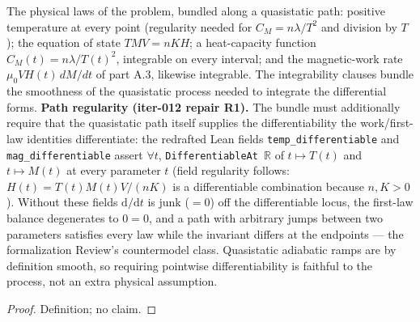 \begin{definition}
\label{def:IPhO2026Problems_problem_IPhO_2026_3_B_2:ParamagneticTorusLaws}
The physical laws of the problem, bundled along a quasistatic path: positive
temperature at every point (regularity needed for $C_M = n\lambda/T^2$ and
division by $T$); the equation of state $T M V = n K H$; a heat-capacity
function $C_M(t) = n\lambda/T(t)^2$, integrable on every interval; and the
magnetic-work rate $\mu_0 V H(t)\,dM/dt$ of part A.3, likewise integrable.
The integrability clauses bundle the smoothness of the quasistatic process
needed to integrate the differential forms.
\textbf{Path regularity (iter-012 repair R1).}  The bundle must additionally
require that the quasistatic path itself supplies the differentiability the
work/first-law identities differentiate: the redrafted Lean fields
\texttt{temp\_differentiable} and \texttt{mag\_differentiable} assert
$\forall t$, \texttt{DifferentiableAt $\mathbb{R}$} of
$t \mapsto T(t)$ and $t \mapsto M(t)$ at every parameter $t$ (field
regularity follows: $H(t) = T(t)M(t)V/(nK)$ is a differentiable combination
because $n, K > 0$).  Without these fields $\mathrm{d}/\mathrm{d}t$ is junk
($= 0$) off the differentiable locus, the first-law balance degenerates to
$0 = 0$, and a path with arbitrary jumps between two parameters satisfies
every law while the invariant differs at the endpoints --- the formalization
Review's countermodel class.  Quasistatic adiabatic ramps are by definition
smooth, so requiring pointwise differentiability is faithful to the process,
not an extra physical assumption.
\end{definition}
\begin{proof}
Definition; no claim.
\end{proof}

